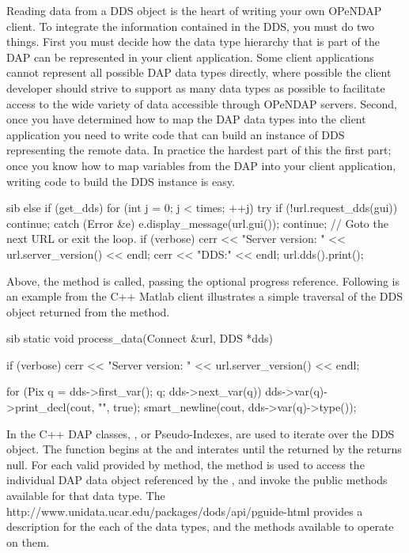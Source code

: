 \documentclass{dods-paper}
\begin{document}
Reading data from a DDS object is the heart of writing your own OPeNDAP client. 
To integrate the information contained in the DDS, you must do two things.
First you must decide how the data type hierarchy that is part of the DAP can be 
represented in your client application.   Some client applications cannot 
represent all possible DAP data types directly, where possible the client 
developer should strive to support as many data types as possible to 
facilitate access to the wide variety of data accessible through OPeNDAP
servers.   Second, once you have determined how to map the DAP data types into
the client application you need to write code that can build an
instance of DDS representing the remote data. In practice the hardest
part of this the first part; once you know how to map variables from
the DAP into your client application, writing code to build the DDS
instance is easy.

\begin{vcode}{sib}
      else if (get_dds) {
            for (int j = 0; j < times; ++j) {
                try {
                    if (!url.request_dds(gui))
                        continue;
                }
                catch (Error &e) {
                    e.display_message(url.gui());
                    continue;   // Goto the next URL or exit the loop.
                }
                if (verbose) {
                    cerr << "Server version: " << url.server_version()
                         << endl;
                    cerr << "DDS:" << endl;
                }
                url.dds().print();
            }
        }
\end{vcode}

Above, the  method  is called, passing
the optional progress  reference.  Following is
an example from the C++ Matlab client illustrates
a simple traversal of the DDS object returned from the
 method.
  
\begin{vcode}{sib}
 static void
 process_data(Connect &url, DDS *dds)
 {
    if (verbose)
        cerr << "Server version: " << url.server_version() << endl;

    for (Pix q = dds->first_var(); q; dds->next_var(q)) {
        dds->var(q)->print_decl(cout, "", true);
        smart_newline(cout, dds->var(q)->type());
    }
 }
\end{vcode}

In the C++ DAP classes, , or Pseudo-Indexes, are used to iterate
over the DDS object.  The  function begins at the 
 and interates until the  returned by the
 returns null.  For each valid  provided by
 method, the  method is used to access
the individual DAP data object referenced by the , and invoke the 
public methods available for that data type.  The 
{http://www.unidata.ucar.edu/packages/dods/api/pguide-html} provides a description 
for the each of the data types, and the methods available to operate on them.
\end{document}
